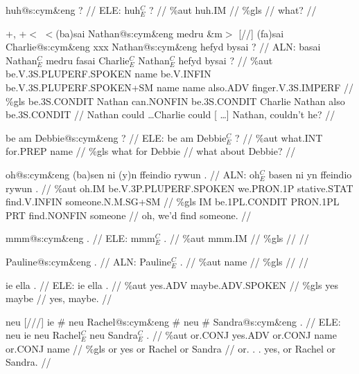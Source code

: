 \documentclass[a4paper,10pt]{article}
\begin{document}
\ex
\begingl[lingstyle=gergl]
\glchat huh@s:cym\&eng ? //
\glsurface ELE:  huh$^{C}_{E}$ ?  //
\glauto \%aut  huh{\scriptsize .IM}   //
\glmanual \%gls     //
\gleng what? //
\endgl
\xe

\ex
\begingl[lingstyle=gergl]
\glchat +, +$<$ $<$(ba)sai Nathan@s:cym\&eng medru \&m$>$ [//] (fa)sai Charlie@s:cym\&eng xxx Nathan@s:cym\&eng hefyd bysai ? //
\glsurface ALN:  basai Nathan$^{C}_{E}$ medru fasai Charlie$^{C}_{E}$ Nathan$^{C}_{E}$ hefyd bysai ?  //
\glauto \%aut  be{\scriptsize .V.3S.PLUPERF.SPOKEN} name be{\scriptsize .V.INFIN} be{\scriptsize .V.3S.PLUPERF.SPOKEN+SM} name name also{\scriptsize .ADV} finger{\scriptsize .V.3S.IMPERF}   //
\glmanual \%gls  be{\scriptsize .3S.CONDIT} Nathan can{\scriptsize .NONFIN} be{\scriptsize .3S.CONDIT} Charlie Nathan also be{\scriptsize .3S.CONDIT}   //
\gleng Nathan could \dots Charlie could [ \dots ] Nathan, couldn't he? //
\endgl
\xe

\ex
\begingl[lingstyle=gergl]
\glchat be am Debbie@s:cym\&eng ? //
\glsurface ELE:  be am Debbie$^{C}_{E}$ ?  //
\glauto \%aut  what{\scriptsize .INT} for{\scriptsize .PREP} name   //
\glmanual \%gls  what for Debbie   //
\gleng what about Debbie? //
\endgl
\xe

\ex
\begingl[lingstyle=gergl]
\glchat oh@s:cym\&eng (ba)sen ni (y)n ffeindio rywun . //
\glsurface ALN:  oh$^{C}_{E}$ basen ni yn ffeindio rywun .  //
\glauto \%aut  oh{\scriptsize .IM} be{\scriptsize .V.3P.PLUPERF.SPOKEN} we{\scriptsize .PRON.1P} stative{\scriptsize .STAT} find{\scriptsize .V.INFIN} someone{\scriptsize .N.M.SG+SM}   //
\glmanual \%gls  IM be{\scriptsize .1PL.CONDIT} PRON{\scriptsize .1PL} PRT find{\scriptsize .NONFIN} someone   //
\gleng oh, we'd find someone. //
\endgl
\xe

\ex
\begingl[lingstyle=gergl]
\glchat mmm@s:cym\&eng . //
\glsurface ELE:  mmm$^{C}_{E}$ .  //
\glauto \%aut  mmm{\scriptsize .IM}   //
\glmanual \%gls     //
\gleng  //
\endgl
\xe

\ex
\begingl[lingstyle=gergl]
\glchat Pauline@s:cym\&eng . //
\glsurface ALN:  Pauline$^{C}_{E}$ .  //
\glauto \%aut  name   //
\glmanual \%gls     //
\gleng  //
\endgl
\xe

\ex
\begingl[lingstyle=gergl]
\glchat ie ella . //
\glsurface ELE:  ie ella .  //
\glauto \%aut  yes{\scriptsize .ADV} maybe{\scriptsize .ADV.SPOKEN}   //
\glmanual \%gls  yes maybe   //
\gleng yes, maybe. //
\endgl
\xe

\ex
\begingl[lingstyle=gergl]
\glchat neu [///] ie \# neu Rachel@s:cym\&eng \# neu \# Sandra@s:cym\&eng . //
\glsurface ELE:  neu ie neu Rachel$^{C}_{E}$ neu Sandra$^{C}_{E}$ .  //
\glauto \%aut  or{\scriptsize .CONJ} yes{\scriptsize .ADV} or{\scriptsize .CONJ} name or{\scriptsize .CONJ} name   //
\glmanual \%gls  or yes or Rachel or Sandra   //
\gleng or. . . yes, or Rachel or Sandra. //
\endgl
\xe
\end{document}
